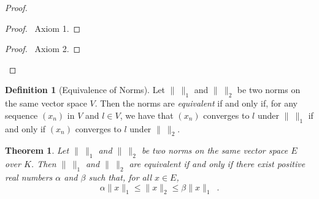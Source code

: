 \documentclass{book}
\let\qed\relax
\newtheorem{thm}[ax]{Theorem}
\theoremstyle{definition}
\newtheorem{df}[ax]{Definition}
\begin{document}
\begin{proof}
\pf
{}
\begin{proof}
	\pf\ Axiom 1.
\end{proof}
\begin{proof}
	\pf\ Axiom 2.
\end{proof}
\qed
\end{proof}

\begin{df}[Equivalence of Norms]
Let $\|\ \|_1$ and $\|\ \|_2$ be two norms on the same vector space $V$. Then the norms are \emph{equivalent} if and only if, for any sequence $(x_n)$ in $V$ and $l \in V$, we have that $(x_n)$ converges to $l$ under $\|\ \|_1$ if and only if $(x_n)$ converges to $l$ under $\|\ \|_2$.
\end{df}

\begin{thm}
\label{thm:equivalent_norms}
Let $\|\ \|_1$ and $\|\ \|_2$ be two norms on the same vector space $E$ over $K$. Then $\|\ \|_1$ and $\|\ \|_2$ are equivalent if and only if there exist positive real numbers $\alpha$ and $\beta$ such that, for all $x \in E$,
\[ \alpha \| x \|_1 \leq \| x \|_2 \leq \beta \| x \|_1 \enspace . \]
\end{thm}
\end{document}

